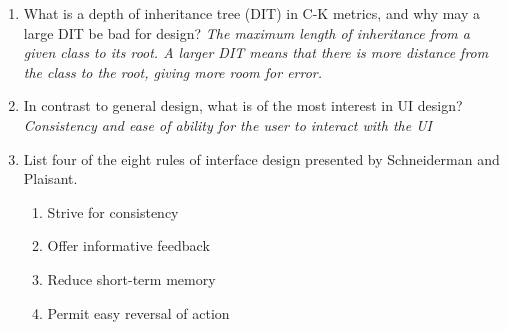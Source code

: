 \documentclass[11pt]{article}
\begin{document}
\begin{enumerate}
        \item What is a depth of inheritance tree (DIT) in C-K metrics, and why may a large DIT be bad for design?
        \newline
        \textit{The maximum length of inheritance from a given class to its root. A larger DIT means that there is more distance from the class to the root, giving more room for error.}
        
        \item In contrast to general design, what is of the most interest in UI design?
        \newline
        \textit{Consistency and ease of ability for the user to interact with the UI}
        \item List four of the eight rules of interface design presented by Schneiderman and Plaisant.
        \begin{enumerate}
            \item Strive for consistency
            \item Offer informative feedback
            \item Reduce short-term memory
            \item Permit easy reversal of action
        \end{enumerate}
    \end{enumerate}
    
    
\end{document}
